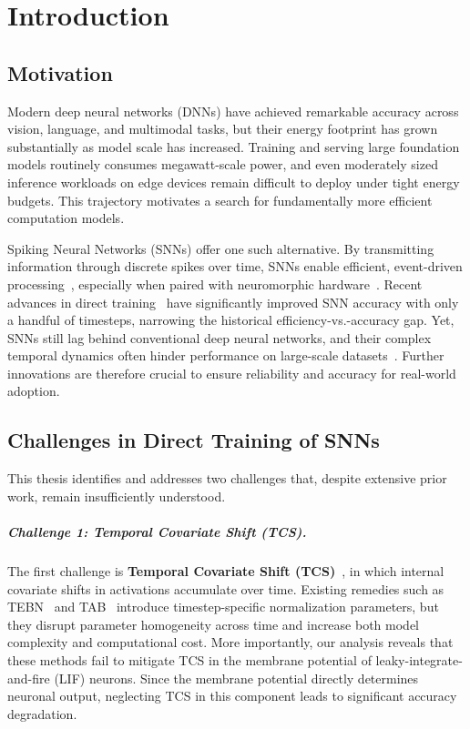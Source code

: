 \chapter{Introduction}
\label{ch:introduction}

\section{Motivation}
\label{sec:intro_motivation}

Modern deep neural networks (DNNs) have achieved remarkable accuracy across vision, language, and multimodal tasks, but their energy footprint has grown substantially as model scale has increased. Training and serving large foundation models routinely consumes megawatt-scale power, and even moderately sized inference workloads on edge devices remain difficult to deploy under tight energy budgets. This trajectory motivates a search for fundamentally more efficient computation models.

Spiking Neural Networks (SNNs) offer one such alternative. By transmitting information through discrete spikes over time, SNNs enable efficient, event-driven processing~\cite{cao:2015, esser:2016, neftci:2018, roy:2019, cramer:2022, rathi:2023}, especially when paired with neuromorphic hardware~\cite{merolla:2014, akopyan:2015, davies:2018}. Recent advances in direct training~\cite{wu:2018, wu:2019} have significantly improved SNN accuracy with only a handful of timesteps, narrowing the historical efficiency-vs.-accuracy gap. Yet, SNNs still lag behind conventional deep neural networks, and their complex temporal dynamics often hinder performance on large-scale datasets~\cite{review_guo:2023, review_zhou:2024}. Further innovations are therefore crucial to ensure reliability and accuracy for real-world adoption.

\section{Challenges in Direct Training of SNNs}
\label{sec:intro_challenges}

This thesis identifies and addresses two challenges that, despite extensive prior work, remain insufficiently understood.

\paragraph{Challenge 1: Temporal Covariate Shift (TCS).}
The first challenge is \textbf{Temporal Covariate Shift (TCS)}~\cite{bntt:2020}, in which internal covariate shifts in activations accumulate over time. Existing remedies such as TEBN~\cite{tebn:2022} and TAB~\cite{tab:2024} introduce timestep-specific normalization parameters, but they disrupt parameter homogeneity across time and increase both model complexity and computational cost. More importantly, our analysis reveals that these methods fail to mitigate TCS in the membrane potential of leaky-integrate-and-fire (LIF) neurons. Since the membrane potential directly determines neuronal output, neglecting TCS in this component leads to significant accuracy degradation.

